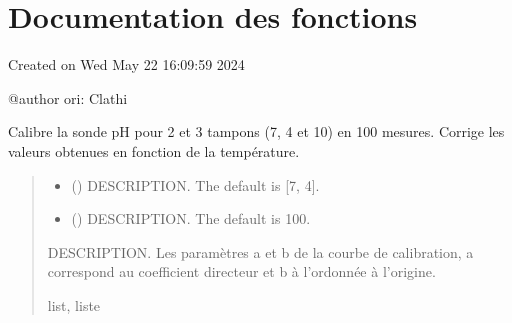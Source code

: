 \documentclass[letterpaper,10pt,french]{sphinxmanual}
\begin{document}
\sphinxstepscope


\chapter{Documentation des fonctions}
\label{\detokenize{library:module-lib_pH}}\label{\detokenize{library:documentation-des-fonctions}}\label{\detokenize{library::doc}}
\sphinxAtStartPar
Created on Wed May 22 16:09:59 2024

\sphinxAtStartPar
@author ori: Clathi

\begin{fulllineitems}
\label{\detokenize{library:lib_pH.Calibration}}
\pysigstartsignatures
\pysiglinewithargsret
{}
{\sphinxparamcomma {}\sphinxparamcomma {}\sphinxparamcomma {}\sphinxparamcomma {}}
{}
\pysigstopsignatures
\sphinxAtStartPar
Calibre la sonde pH pour 2 et 3 tampons (7, 4 et 10) en 100 mesures. Corrige les valeurs obtenues en fonction de la température.
\begin{quote}\begin{description}
\begin{itemize}
\item {} 
\sphinxAtStartPar
{} (\sphinxstyleliteralemphasis{\sphinxupquote{, }}) \textendash{} DESCRIPTION. The default is {[}7, 4{]}.

\item {} 
\sphinxAtStartPar
{} (\sphinxstyleliteralemphasis{\sphinxupquote{, }}) \textendash{} DESCRIPTION. The default is 100.

\end{itemize}

\sphinxAtStartPar
{} \textendash{} DESCRIPTION. Les paramètres a et b de la courbe de calibration, a correspond au coefficient directeur et b à l’ordonnée à l’origine.

\sphinxAtStartPar
list, liste

\end{description}\end{quote}

\end{fulllineitems}
\end{document}
